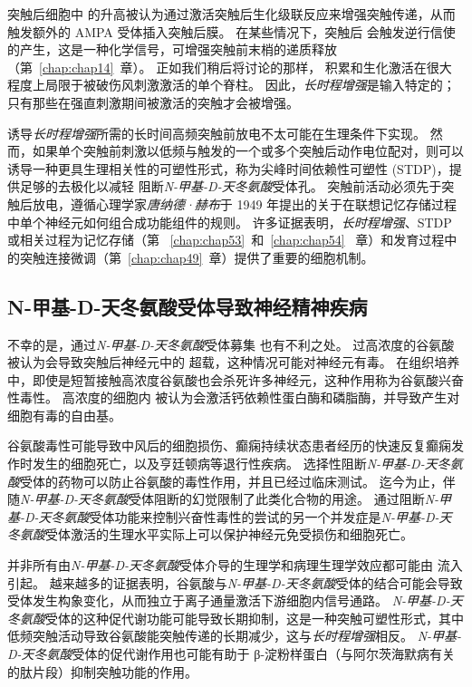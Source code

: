 突触后细胞中  的升高被认为通过激活突触后生化级联反应来增强突触传递，从而触发额外的 AMPA 受体插入突触后膜。
在某些情况下，突触后  会触发逆行信使的产生，这是一种化学信号，可增强突触前末梢的递质释放（第~\ref{chap:chap14}~章）。
正如我们稍后将讨论的那样， 积累和生化激活在很大程度上局限于被破伤风刺激激活的单个脊柱。
因此，\textit{长时程增强}是输入特定的；
只有那些在强直刺激期间被激活的突触才会被增强。


诱导\textit{长时程增强}所需的长时间高频突触前放电不太可能在生理条件下实现。
然而，如果单个突触前刺激以低频与触发的一个或多个突触后动作电位配对，则可以诱导一种更具生理相关性的可塑性形式，称为尖峰时间依赖性可塑性 (STDP)，提供足够的去极化以减轻  阻断\textit{N-甲基-D-天冬氨酸}受体孔。
突触前活动必须先于突触后放电，遵循心理学家\textit{唐纳德·赫布}于 1949 年提出的关于在联想记忆存储过程中单个神经元如何组合成功能组件的规则。 许多证据表明，\textit{长时程增强}、STDP 或相关过程为记忆存储（第 ~\ref{chap:chap53}~和~\ref{chap:chap54}~ 章）和发育过程中的突触连接微调（第~\ref{chap:chap49}~章）提供了重要的细胞机制。



\subsection{N-甲基-D-天冬氨酸受体导致神经精神疾病}

不幸的是，通过\textit{N-甲基-D-天冬氨酸}受体募集  也有不利之处。
过高浓度的谷氨酸被认为会导致突触后神经元中的  超载，这种情况可能对神经元有毒。
在组织培养中，即使是短暂接触高浓度谷氨酸也会杀死许多神经元，这种作用称为谷氨酸兴奋性毒性。
高浓度的细胞内  被认为会激活钙依赖性蛋白酶和磷脂酶，并导致产生对细胞有毒的自由基。


谷氨酸毒性可能导致中风后的细胞损伤、癫痫持续状态患者经历的快速反复癫痫发作时发生的细胞死亡，以及亨廷顿病等退行性疾病。
选择性阻断\textit{N-甲基-D-天冬氨酸}受体的药物可以防止谷氨酸的毒性作用，并且已经过临床测试。
迄今为止，伴随\textit{N-甲基-D-天冬氨酸}受体阻断的幻觉限制了此类化合物的用途。
通过阻断\textit{N-甲基-D-天冬氨酸}受体功能来控制兴奋性毒性的尝试的另一个并发症是\textit{N-甲基-D-天冬氨酸}受体激活的生理水平实际上可以保护神经元免受损伤和细胞死亡。


并非所有由\textit{N-甲基-D-天冬氨酸}受体介导的生理学和病理生理学效应都可能由  流入引起。
越来越多的证据表明，谷氨酸与\textit{N-甲基-D-天冬氨酸}受体的结合可能会导致受体发生构象变化，从而独立于离子通量激活下游细胞内信号通路。 
\textit{N-甲基-D-天冬氨酸}受体的这种促代谢功能可能导致长期抑制，这是一种突触可塑性形式，其中低频突触活动导致谷氨酸能突触传递的长期减少，这与\textit{长时程增强}相反。 
\textit{N-甲基-D-天冬氨酸}受体的促代谢作用也可能有助于 β-淀粉样蛋白（与阿尔茨海默病有关的肽片段）抑制突触功能的作用。


